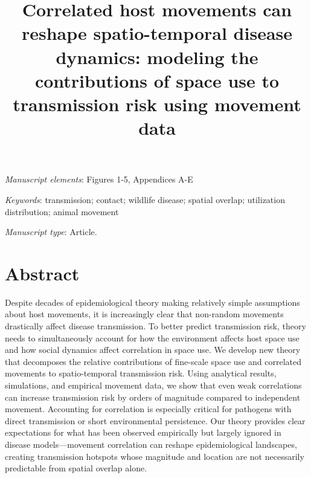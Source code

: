 ﻿\documentclass[11pt]{article}
\title{Correlated host movements can reshape spatio-temporal disease dynamics: modeling the contributions of space use to transmission risk using movement data}
\date{}
\begin{document}
\maketitle



\bigskip

\textit{Manuscript elements}: Figures 1-5, Appendices A-E 

\bigskip

\textit{Keywords}: transmission; contact; wildlife disease; spatial overlap; utilization distribution; animal movement

\bigskip

\textit{Manuscript type}: Article. %

\bigskip


\linenumbers{}
\modulolinenumbers[3]

\newpage{}

\section*{Abstract}

Despite decades of epidemiological theory making relatively simple assumptions about host movements, it is increasingly clear that non-random movements drastically affect disease transmission. To better predict transmission risk, theory needs to simultaneously account for how the environment affects host space use and how social dynamics affect correlation in space use. We develop new theory that decomposes the relative contributions of fine-scale space use and correlated movements to spatio-temporal transmission risk. Using analytical results, simulations, and empirical movement data, we show that even weak correlations can increase transmission risk by orders of magnitude compared to independent movement. Accounting for correlation is especially critical for pathogens with direct transmission or short environmental persistence. Our theory provides clear expectations for what has been observed empirically but largely ignored in disease models---movement correlation can reshape epidemiological landscapes, creating transmission hotspots whose magnitude and location are not necessarily predictable from spatial overlap alone.
\end{document}
